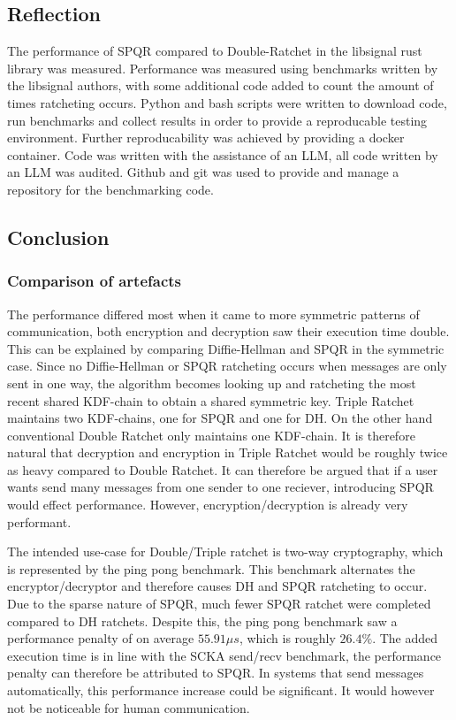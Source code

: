 \subsection{Reflection} %
The performance of SPQR compared to Double-Ratchet in the libsignal rust library was measured.
Performance was measured using benchmarks written by the libsignal authors, with some additional code added to count the amount of times ratcheting occurs.
Python and bash scripts were written to download code, run benchmarks and collect results in order to provide a reproducable testing environment.
Further reproducability was achieved by providing a docker container.
Code was written with the assistance of an LLM, all code written by an LLM was audited.
Github and git was used to provide and manage a repository for the benchmarking code.

\subsection{Conclusion}
\subsubsection{Comparison of artefacts}
The performance differed most when it came to more symmetric patterns of communication, both encryption and decryption saw their execution time double.
This can be explained by comparing Diffie-Hellman and SPQR in the symmetric case.
Since no Diffie-Hellman or SPQR ratcheting occurs when messages are only sent in one way,
the algorithm becomes looking up and ratcheting the most recent shared KDF-chain to obtain a shared symmetric key.
Triple Ratchet maintains two KDF-chains, one for SPQR and one for DH.
On the other hand conventional Double Ratchet only maintains one KDF-chain.
It is therefore natural that decryption and encryption in Triple Ratchet would be roughly twice as heavy compared to Double Ratchet.
It can therefore be argued that if a user wants send many messages from one sender to one reciever,
introducing SPQR would effect performance.
However, encryption/decryption is already very performant.

The intended use-case for Double/Triple ratchet is two-way cryptography, which is represented by the ping pong benchmark.
This benchmark alternates the encryptor/decryptor and therefore causes DH and SPQR ratcheting to occur.
Due to the sparse nature of SPQR, much fewer SPQR ratchet were completed compared to DH ratchets.
Despite this, the ping pong benchmark saw a performance penalty of on average $55.91 \mu s$, which is roughly $26.4\%$.
The added execution time is in line with the SCKA send/recv benchmark, the performance penalty can therefore be attributed to SPQR.
In systems that send messages automatically, this performance increase could be significant.
It would however not be noticeable for human communication.


